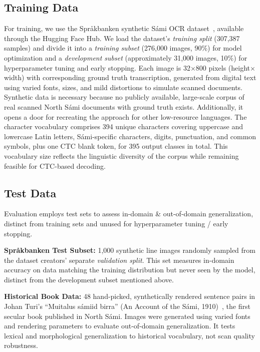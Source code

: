 \documentclass[conference]{IEEEtran}
\newcommand{\trainSamples}{276,000}
\newcommand{\hfTestSamples}{1,000}
\newcommand{\hfValidationSamples}{31,000}
\newcommand{\bookTestSamples}{48}
\newcommand{\charsetSize}{395}
\newcommand{\numCharsVocab}{394}
\begin{document}
\subsection{Training Data}
\label{subsec:training_data}

For training, we use the Spr\r{a}kbanken synthetic S\'{a}mi OCR dataset~\cite{enstad2025}, available through the Hugging Face Hub. We load the dataset's \textit{training split} (307,387 samples) and divide it into a \textit{training subset} (\trainSamples{} images, 90\%) for model optimization and a \textit{development subset} (approximately \hfValidationSamples{} images, 10\%) for hyperparameter tuning and early stopping. 
Each image is 32$\times$800 pixels (height$\times$width) with corresponding ground truth transcription, generated from digital text using varied fonts, sizes, and mild distortions to simulate scanned documents. Synthetic data is necessary because no publicly available, large-scale corpus of real scanned North S\'{a}mi documents with ground truth exists. Additionally, it opens a door for recreating the approach for other low-resource languages. The character vocabulary comprises \numCharsVocab{} unique characters covering uppercase and lowercase Latin letters, S\'{a}mi-specific characters, digits, punctuation, and common symbols, plus one CTC blank token, for \charsetSize{} output classes in total. This vocabulary size reflects the linguistic diversity of the corpus while remaining feasible for CTC-based decoding.

\subsection{Test Data}
\label{subsec:test_data}

Evaluation employs test sets to assess in-domain \& out-of-domain generalization, distinct from training sets and unused for hyperparameter tuning / early stopping.

\textbf{Spr\r{a}kbanken Test Subset:} \hfTestSamples{} synthetic line images randomly sampled from the dataset creators' separate \textit{validation split}. This set measures in-domain accuracy on data matching the training distribution but never seen by the model, distinct from the development subset mentioned above.

\textbf{Historical Book Data:} \bookTestSamples{} hand-picked, synthetically rendered sentence pairs in Johan Turi's ``Muitalus s\'{a}miid birra'' (An Account of the S\'{a}mi, 1910)~\cite{turi1910}, the first secular book published in North S\'{a}mi. Images were generated using varied fonts and rendering parameters to evaluate out-of-domain generalization. It tests lexical and morphological generalization to historical vocabulary, not scan quality robustness.
\end{document}
